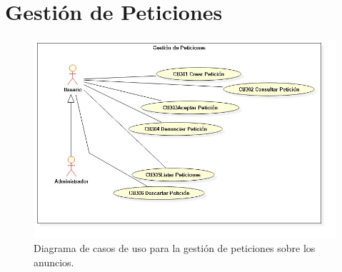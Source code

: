 \section{Gesti\'{o}n de Peticiones}
\begin{figure}[h]
\centering
\includegraphics[width=1\textwidth]{Img/CasosDeUso/DCU03.jpg}
\caption{Diagrama de casos de uso para la gesti\'{o}n de peticiones sobre los anuncios.}
\label{fig:dcu}
\end{figure}
